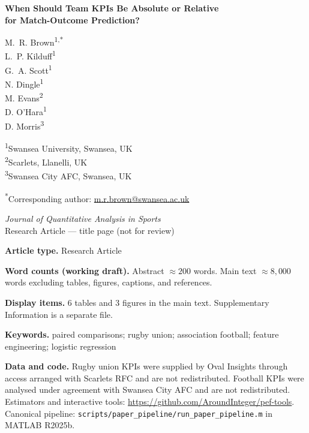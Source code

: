 \documentclass[12pt,letterpaper]{article}
\begin{document}
\begin{center}
{\LARGE\bfseries When Should Team KPIs Be Absolute or Relative\\
for Match-Outcome Prediction?}

\vspace{2em}

M.~R. Brown\textsuperscript{1,*}\\
L.~P. Kilduff\textsuperscript{1}\\
G.~A. Scott\textsuperscript{1}\\
N. Dingle\textsuperscript{1}\\
M. Evans\textsuperscript{2}\\
D. O'Hara\textsuperscript{1}\\
D. Morris\textsuperscript{3}

\vspace{1.5em}

\textsuperscript{1}Swansea University, Swansea, UK\\
\textsuperscript{2}Scarlets, Llanelli, UK\\
\textsuperscript{3}Swansea City AFC, Swansea, UK

\vspace{1em}

\textsuperscript{*}Corresponding author: \href{mailto:m.r.brown@swansea.ac.uk}{m.r.brown@swansea.ac.uk}

\vspace{2em}

\textit{Journal of Quantitative Analysis in Sports}\\
Research Article --- title page (not for review)
\end{center}

\vspace{2em}

\noindent\textbf{Article type.} Research Article

\noindent\textbf{Word counts (working draft).} Abstract $\approx 200$ words. Main text $\approx 8{,}000$ words excluding tables, figures, captions, and references.

\noindent\textbf{Display items.} 6 tables and 3 figures in the main text. Supplementary Information is a separate file.

\noindent\textbf{Keywords.} paired comparisons; rugby union; association football; feature engineering; logistic regression

\noindent\textbf{Data and code.} Rugby union KPIs were supplied by Oval Insights through access arranged with Scarlets RFC and are not redistributed. Football KPIs were analysed under agreement with Swansea City AFC and are not redistributed. Estimators and interactive tools: \url{https://github.com/AroundInteger/pef-tools}. Canonical pipeline: \texttt{scripts/paper\_pipeline/run\_paper\_pipeline.m} in {MATLAB} {R2025b}.
\end{document}
